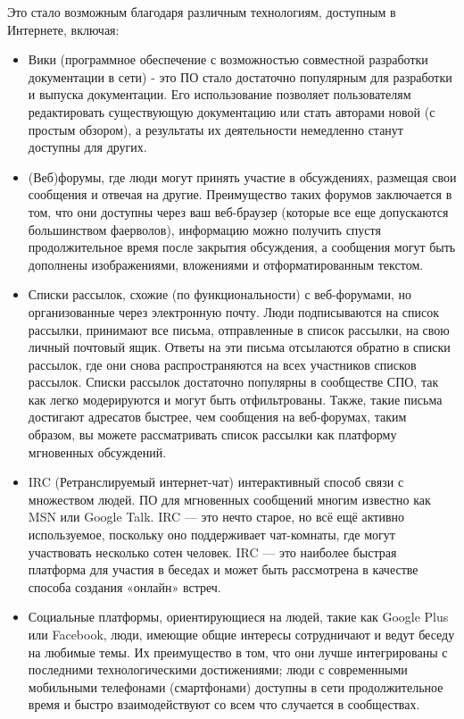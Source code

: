 \documentclass[12pt]{book}
\begin{document}
Это стало возможным благодаря различным технологиям, доступным в Интернете, включая:

\begin{itemize}
	\item Вики (программное обеспечение с возможностью совместной разработки документации в сети) - это ПО стало достаточно популярным для разработки и выпуска документации. Его использование позволяет пользователям редактировать существующую документацию или стать авторами новой (с простым обзором), а результаты их деятельности немедленно станут доступны для других.
	\item (Веб)форумы, где люди могут принять участие в обсуждениях, размещая свои сообщения и отвечая на другие. Преимущество таких форумов заключается в том, что они доступны через ваш веб-браузер (которые все еще допускаются большинством фаерволов), информацию можно получить спустя продолжительное время после закрытия обсуждения, а сообщения могут быть дополнены изображениями, вложениями и отформатированным текстом.
	\item Списки рассылок, схожие (по функциональности) с веб-форумами, но организованные через электронную почту. Люди подписываются на список рассылки,  принимают все письма, отправленные в список рассылки, на свою личный почтовый ящик. Ответы на эти письма отсылаются обратно в списки рассылок, где они снова распространяются на всех участников списков рассылок. Списки рассылок достаточно популярны в сообществе СПО, так как легко модерируются и могут быть отфильтрованы. Также, такие письма достигают адресатов быстрее, чем сообщения на веб-форумах, таким образом, вы можете рассматривать список рассылки как платформу мгновенных обсуждений.
	\item IRC (Ретранслируемый интернет-чат) интерактивный способ связи с множеством людей. ПО для мгновенных сообщений многим известно как MSN или Google Talk. IRC — это нечто старое, но всё ещё активно используемое, поскольку оно поддерживает чат-комнаты, где могут участвовать несколько сотен человек. IRC — это наиболее быстрая платформа для участия в беседах и может быть рассмотрена в качестве способа создания «онлайн» встреч.
	\item Социальные платформы, ориентирующиеся на людей, такие как Google Plus или Facebook, люди, имеющие общие интересы сотрудничают и ведут беседу на любимые темы. Их преимущество в том, что они лучше интегрированы с последними технологическими достижениями; люди с современными мобильными телефонами (смартфонами) доступны в сети продолжительное время и быстро взаимодействуют со всем что случается в сообществах.
\end{itemize}
\end{document}
